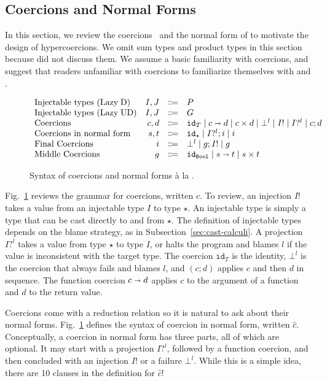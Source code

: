 \documentclass[runningheads]{llncs}
\newcommand{\stxrule}[3]{\text{#2} & #1 & \Coloneqq & #3\\}
\newcommand{\figref}[1]{Fig.~\ref{#1}}
\newcommand{\LUD}{\ensuremath{\text{Lazy\;UD}}}
\newcommand{\LD}{\ensuremath{\text{Lazy\;D}}}
\newcommand{\Tdyn}[0]{\ensuremath{\star}}
\newcommand{\Pbool}[0]{\ensuremath{\mathtt{Bool}}}
\newcommand{\Pfunc}[2]{\ensuremath{#1 \shortrightarrow #2}}
\newcommand{\Pprod}[2]{\ensuremath{#1 \times #2}}
\newcommand{\cnfproj}[2]{#1?^{#2}}
\newcommand{\cnfinj}[1]{#1!}
\newcommand{\cnfseq}[2]{#1;#2}
\newcommand{\cnffail}[1]{\bot^{#1}}
\newcommand{\cnffunc}[2]{\Pfunc{#1}{#2}}
\newcommand{\cnfprod}[2]{\Pprod{#1}{#2}}
\newcommand{\cnfid}[1]{\ensuremath{\mathtt{id}_{#1}}}
\begin{document}
\subsection{Coercions and Normal Forms} 
\label{sec:coercions}

In this section, we review the
coercions~\citep{henglein1994dynamic,herman2010space} and the normal form of
\citet{siek2012interpretations} to motivate the design of hypercoercions.  We
omit sum types and product types in this section because
\citet{siek2012interpretations} did not discuss them. We assume a basic
familiarity with coercions, and suggest that readers unfamiliar with coercions
to familiarize themselves with \citet{siek2012interpretations} and
\citet{Siek:2015:BCT:2737924.2737968}.

\begin{figure}
	\[
	\begin{array}{lrcl}
	\stxrule{I,J}{Injectable types (\LD)}{P}
	\stxrule{I,J}{Injectable types (\LUD)}{G}
	\stxrule{c,d}{Coercions}{
		\cnfid{T}       \mid
		\cnffunc{c}{d}  \mid
		\cnfprod{c}{d}  \mid
		\cnffail{l}     \mid
		\cnfinj{I}      \mid
		\cnfproj{I}{l}  \mid
		\cnfseq{c}{d}
	}
	\stxrule{s,t}{Coercions in normal form}{
		\cnfid{\Tdyn}       \mid
		\cnfseq{\cnfproj{I}{l}}{i} \mid
		i
	}
	\stxrule{i}{Final Coercions}{
		\cnffail{l} \mid
		\cnfseq{g}{\cnfinj{I}} \mid
		g
	}
	\stxrule{g}{Middle Coercions}{
		\cnfid{\Pbool} \mid
		\cnffunc{s}{t} \mid
		\cnfprod{s}{t}
	}
	\end{array}
	\]
	\caption{Syntax of coercions and normal forms {\`a} la 
		\citep{siek2012interpretations}.}
	\label{fig:normal-coercion}
\end{figure}

\figref{fig:normal-coercion} reviews the grammar for coercions,
written $c$.
%
To review, an injection $\cnfinj{I}$ takes a value from an injectable type
$I$ to type $\Tdyn$. An injectable type is simply a type that can be
cast directly to and from $\Tdyn$. The
definition of injectable types depends on the blame strategy, as in 
Subsection~\ref{sec:cast-calculi}.
%
A projection $I?^l$ takes a value from type $\Tdyn$ to type $I$, or
halts the program and blames $l$ if the value is inconsistent with 
the target type.
The coercion \cnfid{T} is the identity, $\bot^{l}$ is the coercion that
always fails and blames $l$, and $(\cnfseq{c}{d})$ applies $c$ and
then $d$ in sequence. The function coercion $\cnffunc{c}{d}$
applies $c$ to the argument of a function and $d$ to the return
value.

Coercions come with a reduction relation so it is natural to ask about
their normal forms. \figref{fig:normal-coercion} defines the syntax of
coercion in normal form, written $\hat{c}$. Conceptually, a coercion
in normal form has three parts, all of which are optional.  It may
start with a projection $I?^l$, followed by a function coercion, and
then concluded with an injection $I!$ or a failure $\bot^l$. While
this is a simple idea, there are 10 clauses in the definition for
$\hat{c}$!
\end{document}
